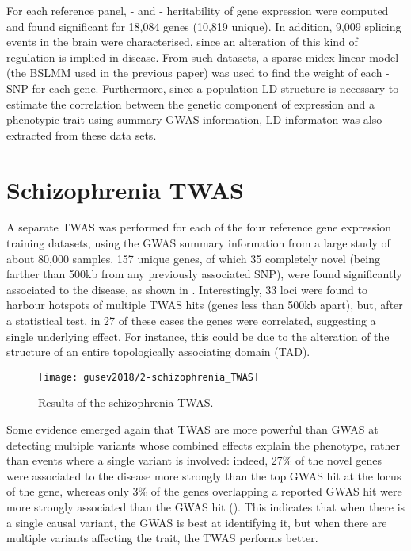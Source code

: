 \documentclass[../main.tex]{subfiles}
\begin{document}
For each reference panel, \cis- and \trans- heritability of gene 
expression were computed and found significant for 18,084 genes (10,819 
unique). In addition, 9,009 splicing events in the brain were 
characterised, since an alteration of this kind of regulation is implied 
in disease. From such datasets, a sparse midex linear model (the BSLMM 
used in the previous paper) was used to find the weight of each \cis-SNP 
for each gene. Furthermore, since a population LD structure is necessary 
to estimate the correlation between the genetic component of expression 
and a phenotypic trait using summary GWAS information, LD informaton was 
also extracted from these data sets.

\section{Schizophrenia TWAS}

A separate TWAS was performed for each of the four reference gene 
expression training datasets, using the GWAS summary information from a 
large study of about 80,000 samples. 157 unique genes, of which 35 
completely novel (\ie being farther than 500kb from any previously 
associated SNP), were found significantly associated to the disease, as 
shown in . Interestingly, 33 loci were found to 
harbour hotspots of multiple TWAS hits (\ie genes less than 500kb 
apart), but, after a statistical test, in 27 of these cases the genes 
were correlated, suggesting a single underlying effect. For instance, 
this could be due to the alteration of the structure of an entire 
topologically associating domain (TAD).


\begin{figure}
	\texttt{[image: gusev2018/2-schizophrenia\_TWAS]}
	\caption{Results of the schizophrenia TWAS.}
\end{figure}

Some evidence emerged again that TWAS are more powerful than GWAS at 
detecting multiple variants whose combined effects explain the 
phenotype, rather than events where a single variant is involved: 
indeed, 27\% of the novel genes were associated to the disease more 
strongly than the top GWAS hit at the locus of the gene, whereas only 
3\% of the genes overlapping a reported GWAS hit were more strongly 
associated than the GWAS hit (). This indicates 
that when there is a single causal variant, the GWAS is best at 
identifying it, but when there are multiple variants affecting the 
trait, the TWAS performs better.
\end{document}
